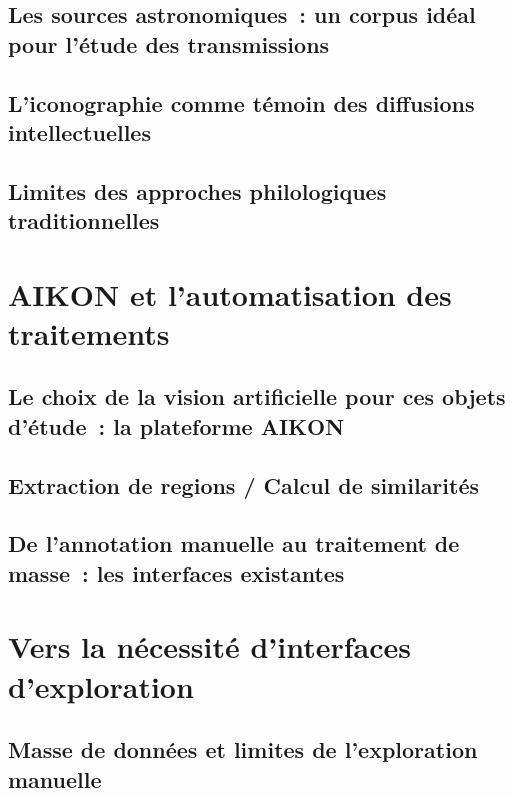\documentclass[a4paper,12pt,twoside]{book}
\newcommand{\clearemptydoublepage}{\newpage{\pagestyle{empty}\cleardoublepage}}
\begin{document}
	\section[Un corpus idéal pour l'étude des transmissions]{Les sources astronomiques~: un corpus idéal pour l'étude des transmissions}
	

	\section[L'iconographie témoin des diffusions intellectuelles]{L'iconographie comme témoin des diffusions intellectuelles}

	

	\section{Limites des approches philologiques traditionnelles}
	

	\clearemptydoublepage

	\chapter{AIKON et l'automatisation des traitements}
	\section{Le choix de la vision artificielle pour ces objets d'étude~: la plateforme AIKON}

	\section{Extraction de regions / Calcul de similarités}

	\section{De l'annotation manuelle au traitement de masse~: les interfaces existantes}

	\clearemptydoublepage

	\chapter{Vers la nécessité d'interfaces d'exploration}
	\section{Masse de données et limites de l'exploration manuelle}
\end{document}
